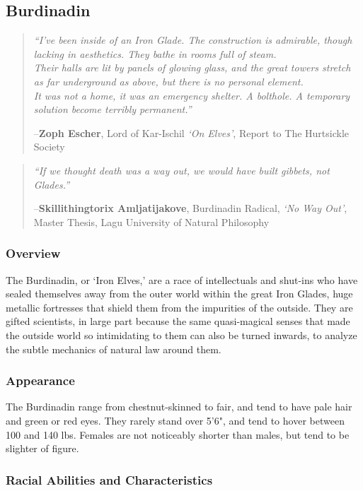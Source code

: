 \documentclass[oneside,11pt,english]{book}
\begin{document}
\subsection{Burdinadin} %
\begin{quote}
\emph{``I've been inside of an Iron Glade. The construction is admirable, though lacking in aesthetics. They bathe in rooms full of steam.\\
Their halls are lit by panels of glowing glass, and the great towers stretch as far underground as above, but there is no personal element.\\
It was not a home, it was an emergency shelter. A bolthole. A temporary solution become terribly permanent.''}

\vspace*{-5pt}\hfill--\textbf{Zoph Escher}, Lord of Kar-Ischil \textit{‘On Elves’}, Report to The Hurtsickle Society
\end{quote}
\begin{quote}
\emph{``If we thought death was a way out, we would have built gibbets, not Glades.''}

\hfill --\textbf{Skillithingtorix Amljatijakove}, Burdinadin Radical, \textit{‘No Way Out’}, Master Thesis, Lagu University of Natural Philosophy
\end{quote}

\subsubsection*{Overview}
The Burdinadin, or ‘Iron Elves,’ are a race of intellectuals and shut-ins who have sealed themselves away 
from the outer world within the great Iron Glades, huge metallic fortresses that shield them from the 
impurities of the outside. They are gifted scientists, in large part because the same quasi-magical senses 
that made the outside world so intimidating to them can also be turned inwards, to analyze the subtle 
mechanics of natural law around them. 

\subsubsection*{Appearance} 
The Burdinadin range from chestnut-skinned to fair, and tend to have pale hair and green or red eyes. 
They rarely stand over 5'6", and tend to hover between 100 and 140 lbs. Females are not noticeably 
shorter than males, but tend to be slighter of figure. 

\subsubsection*{Racial Abilities and Characteristics} 
\end{document}

